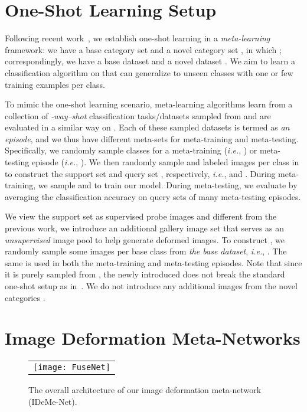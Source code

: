 \documentclass[10pt,letterpaper,twocolumn]{article}
\providecommand{\tabularnewline}{\\}
\begin{document}
\section{One-Shot Learning Setup}



\label{sec:oneShotSetting}

Following recent work~\cite{matchingnet_1shot,Sachin2017,MAML,prototype_network,imaginaryData},
we establish one-shot learning in a \emph{meta-learning} framework:
we have a base category set  and a novel category
set , in which ;
correspondingly, we have a base dataset  and a novel dataset . We aim to learn a classification algorithm
on  that can generalize to unseen classes 
with one or few training examples per class.

To mimic the one-shot learning scenario, meta-learning algorithms
learn from a collection of \emph{-way--shot} classification
tasks/datasets sampled from  and are evaluated in a similar
way on . Each of these sampled datasets is termed as \emph{an
episode}, and we thus have different meta-sets for meta-training and
meta-testing. Specifically, we randomly sample  classes 
for a meta-training (\emph{i.e.}, ) or meta-testing episode
(\emph{i.e.}, ). We then randomly sample  and  labeled
images per class in  to construct the support set  and query
set , respectively, \emph{i.e.},  and .
During meta-training, we sample  and  to train our model.
During meta-testing, we evaluate by averaging the classification accuracy
on query sets  of many meta-testing episodes.

We view the support set as supervised probe images and different from
the previous work, we introduce an additional gallery image set 
that serves as an \emph{unsupervised} image pool to help generate
deformed images. To construct , we randomly sample some images
per base class from \emph{the base dataset}, \emph{i.e.}, .
The same  is used in both the meta-training and meta-testing episodes.
Note that since it is purely sampled from , the newly introduced
 does not break the standard one-shot setup as in~\cite{prototype_network,MAML,Sachin2017}.
We do not introduce any additional images from the novel categories
.

\section{Image Deformation Meta-Networks}

\begin{figure*}


\begin{centering}
\begin{tabular}{c}
\texttt{[image: FuseNet]}\tabularnewline
\end{tabular}
\par\end{centering}
\caption{\label{fig:FuseNet}The overall architecture of our image deformation
meta-network (IDeMe-Net). }



\end{figure*}
\end{document}
